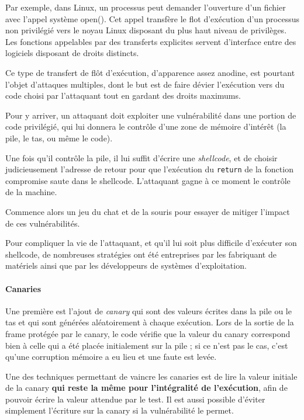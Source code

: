 Par exemple, dans Linux, un processus peut demander l’ouverture d’un fichier avec l’appel système open(). Cet appel transfère le flot d’exécution d’un processus non privilégié vers le noyau Linux disposant du plus haut niveau de privilèges. Les fonctions appelables par des transferts explicites servent d’interface entre des logiciels disposant de droits distincts.

Ce type de transfert de flôt d'exécution, d'apparence assez anodine, est pourtant l'objet d'attaques multiples, dont le but est de faire dévier l'exécution vers du code choisi par l'attaquant tout en gardant des droits maximums.

Pour y arriver, un attaquant doit exploiter une vulnérabilité dans une portion de code privilégié, qui lui donnera le contrôle d'une zone de mémoire d'intérêt (la pile, le tas, ou même le code).

Une fois qu'il contrôle la pile, il lui suffit d'écrire une \emph{shellcode}, et de choisir judicieusement l'adresse de retour pour que l'exécution du \texttt{return} de la fonction compromise saute dans le shellcode. L'attaquant gagne à ce moment le contrôle de la machine.

Commence alors un jeu du chat et de la souris pour essayer de mitiger l'impact de ces vulnérabilités.

Pour compliquer la vie de l'attaquant, et qu'il lui soit plus difficile d'exécuter son shellcode, de nombreuses stratégies ont été entreprises par les fabriquant de matériels ainsi que par les développeurs de systèmes d'exploitation. 

\paragraph{Canaries}
Une première est l'ajout de \emph{canary} qui sont des valeurs écrites dans la pile ou le tas et qui sont générées aléatoirement à chaque exécution. Lors de la sortie de la frame protégée par le canary, le code vérifie que la valeur du canary correspond bien à celle qui a été placée initialement sur la pile ; si ce n'est pas le cas, c'est qu'une corruption mémoire a eu lieu et une faute est levée.

Une des techniques permettant de vaincre les canaries est de lire la valeur initiale de la canary \textbf{qui reste la même pour l'intégralité de l'exécution}, afin de pouvoir écrire la valeur attendue par le test. Il est aussi possible d'éviter simplement l'écriture sur la canary si la vulnérabilité le permet.


